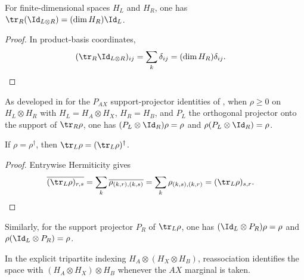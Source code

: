 \begin{lemma}
    \label{lem:partial_trace_right_identity}
    \leanok
    For finite-dimensional spaces $H_L$ and $H_R$, one has
    $\tr_R(\Id_{L\otimes R})=(\dim H_R)\Id_L$.
\end{lemma}

\begin{proof}
    \leanok
    In product-basis coordinates,
    \begin{align}
        (\tr_R\Id_{L\otimes R})_{ij}
         & =\sum_k\delta_{ij} =(\dim H_R)\delta_{ij}.
        \notag
    \end{align}
\end{proof}


As developed in \cite{QICLean2026Blueprint} for the $P_{AX}$ support-projector
identities of \cite[Appendix~D.2]{Cirac2016MPDO_arXiv}, when $\rho \ge 0$ on
$H_L\otimes H_R$ with $H_L=H_A\otimes H_X$, $H_R=H_B$, and $P_L$ the orthogonal
projector onto the support of $\tr_R\rho$, one has
$(P_L\otimes\Id_R)\rho=\rho$ and $\rho(P_L\otimes\Id_R)=\rho$.

\begin{lemma}
    \label{thm:partial_trace_left_hermitian}
    \leanok
    If $\rho=\rho^\dagger$, then
    $\tr_L\rho=(\tr_L\rho)^\dagger$.
\end{lemma}

\begin{proof}
    \leanok
    Entrywise Hermiticity gives
    \begin{align}
        \overline{(\tr_L\rho)_{r,s}}
         & =\sum_k\overline{\rho_{(k,r),(k,s)}} =\sum_k\rho_{(k,s),(k,r)} =(\tr_L\rho)_{s,r}.
        \notag
    \end{align}
\end{proof}


Similarly, for the support projector $P_R$ of $\tr_L\rho$, one has
$(\Id_L\otimes P_R)\rho=\rho$ and $\rho(\Id_L\otimes P_R)=\rho$.

In the explicit tripartite indexing
$H_A\otimes(H_X\otimes H_B)$, reassociation identifies the space with
$(H_A\otimes H_X)\otimes H_B$ whenever the $AX$ marginal is taken.

